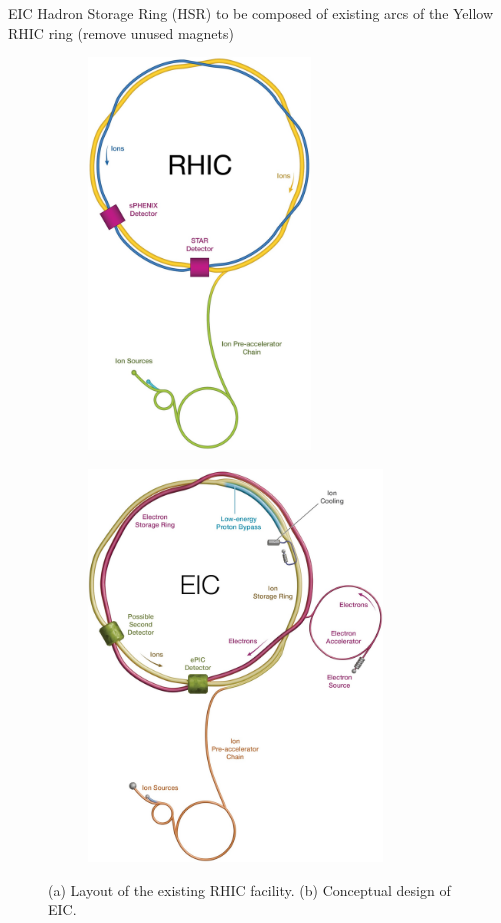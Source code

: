 EIC Hadron Storage Ring (HSR) to be composed of
existing arcs of the Yellow RHIC ring (remove
unused magnets)

\begin{figure}[H]
    \centering
    \begin{subfigure}{0.4\linewidth}
        \includegraphics[height=10.4cm]{img/rhic.jpg}
        \caption{} %
        \label{fig:eic:comparison::rhic}
    \end{subfigure}
    \raisebox{20\height}{\Huge$\rightarrow$}
    \begin{subfigure}{0.52\linewidth}
        \includegraphics[height=10.4cm]{img/eic.jpg}
        \caption{} %
        \label{fig:eic:comparison::eic}
    \end{subfigure}
    \caption{(a) Layout of the existing RHIC facility. (b) Conceptual design of EIC.}
    \label{fig:eic:comparison}
\end{figure}

